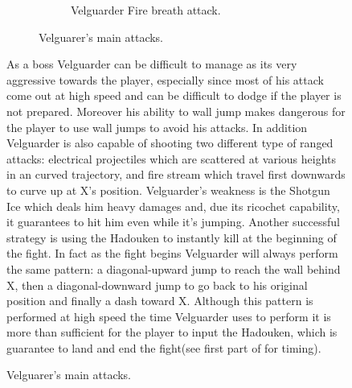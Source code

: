 \begin{figure}[htp]
\begin{figure}[htp]
\begin{subfigure}[t]{0.5\linewidth}
		\caption{Velguarder Fire breath attack.}
	\end{subfigure}
	\caption{Velguarer's main attacks.}
\end{figure} 
As a boss Velguarder can be difficult to manage as its very aggressive towards the player, especially since most of his attack come out at high speed and can be difficult to dodge if the player is not prepared. Moreover his ability to wall jump makes dangerous for the player to use wall jumps to avoid his attacks. In addition Velguarder is also capable of shooting two different type of ranged attacks: electrical projectiles which are scattered at various heights in an curved trajectory, and fire stream which travel first downwards to curve up at X's position. Velguarder's weakness is the Shotgun Ice which deals him heavy damages and, due its ricochet capability, it guarantees to hit him even while it's jumping. Another successful strategy is using the Hadouken to instantly kill at the beginning of the fight. In fact as the fight begins Velguarder will always perform the same pattern: a diagonal-upward jump to reach the wall behind X, then a diagonal-downward jump to go back to his original position and finally a dash toward X. Although this pattern is performed at high speed the time Velguarder uses to perform it is more than sufficient for the player to input the Hadouken, which is guarantee to land and end the fight(see first part of  for timing).


\end{figure}
